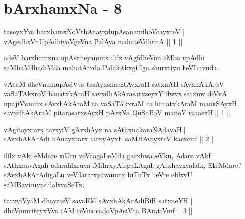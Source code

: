 \chapter{bArxhamxNa - 8}

\begin{shl}
taseyxYva barxhamxNoV\s thAnayxdupAsanamihoVcayxteV | \\
vAgedhxVnUpAdhiyoVgeVna PalAya mahateV\s dhunA \hfill ||  1 || 
\end{shl}

\begin{artha}
adeV barxhamxna upAsaneyanunx ililx vAgfdheVnu eMba upAdhi saMbaMdhadiMda mahatAtxda PalakAkxgi Iga shurxtiyu heVLuvudu.
\end{artha}


\begin{kandikeshl}
vAcaM dheVnumupAsiVta tasAyxshacxtAvxraH satxnAH sAvxhAkAroV vaSaTAkxroV hanatxkAraH savxdhAkArasatxseyxY dwvx satxnw deVvA upajiVvanitx sAvxhAkAraM ca vaSaTAkxraM ca hanatxkAraM manuSAyxH savxdhAkAraM pitarasatxsAyxH pArxNa QuSaBoV manoV vatasxH || 1 ||
\end{kandikeshl}


\begin{shl}
vAgitayxtarx tarxyiV gArxhAyx na sAthxnakaraNAdayaH | \\
sAvxhAkArAdi nAnayxtarx tarxyAyxH saMBAvayxteV kacxcitf \hfill ||  2 || 
\end{shl}

\begin{artha}
ililx vAkf eMdare mUru veVdagaLeMdu garxhisabeVku, Adare vAkf sAthxnavAgali adaralilxruva iMdirxyAdigaLAgali gArxhayxvalalx, EkeMdare? sAvxhAkArAdigaLu veVdatarxyavanunx biTuTx beVre elilxyU saMBavisuvudilalxvaSeTx.
\end{artha}

\begin{shl}
tarxyiVyaM dhayateV savaRM sAvxhAkArAdiBiH satxneYH | \\
dheVnumiteyxVva tAM teVna sadoVpAsiVta BAratiVmf \hfill ||  3 || 
\end{shl}

